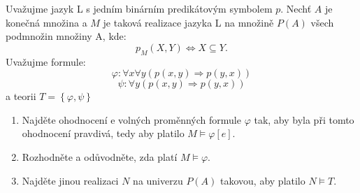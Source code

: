 Uvažujme jazyk L s jedním binárním predikátovým symbolem $p$. Nechť $A$ je
konečná množina a $M$ je taková realizace jazyka L na množině $P(A)$ všech
podmnožin množiny A, kde:
$$p_{M}(X,Y) \Leftrightarrow X\subseteq Y.$$
Uvažujme formule:
$$\varphi: \forall x \forall y (p(x,y) \Rightarrow p(y,x))$$
$$\psi: \forall y (p(x,y) \Rightarrow p(y,x))$$
a teorii $T=\left \{ \varphi, \psi \right \}$
\begin{enumerate}[(1)]
  \item Najděte ohodnocení e volných proměnných formule $\varphi$ tak, aby byla
  při tomto ohodnocení pravdivá, tedy aby platilo $M\models \varphi[e]$.
  \item Rozhodněte a odůvodněte, zda platí $M\models \varphi$.
  \item Najděte jinou realizaci $N$ na univerzu $P(A)$ takovou, aby platilo $N
  \models T$.
\end{enumerate}

